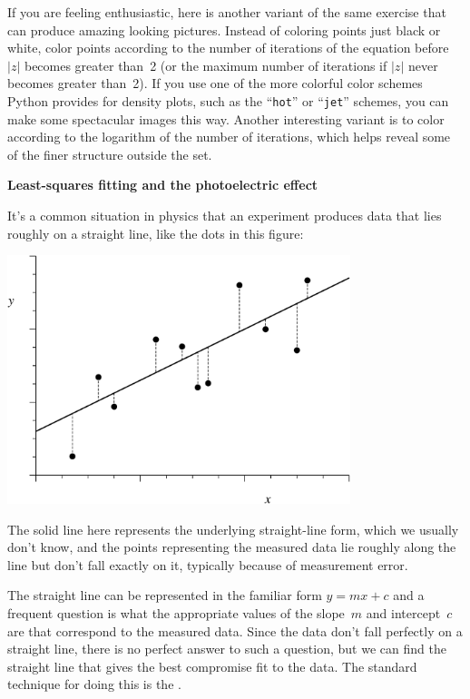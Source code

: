 \documentclass[12pt]{article}
\begin{document}
\begin{exercises}
If you are feeling enthusiastic, here is another variant of the same
exercise that can produce amazing looking pictures.  Instead of coloring
points just black or white, color points according to the number of
iterations of the equation before $|z|$ becomes greater than~2 (or the
maximum number of iterations if $|z|$ never becomes greater than~2).  If
you use one of the more colorful color schemes Python provides for density
plots, such as the ``\verb|hot|'' or ``\verb|jet|'' schemes, you can make
some spectacular images this way.  Another interesting variant is to color
according to the logarithm of the number of iterations, which helps reveal
some of the finer structure outside the set.



\exercise \textbf{Least-squares fitting and the photoelectric effect}

\exskip It's a common situation in physics that an experiment produces data
that lies roughly on a straight line, like the dots in this figure:
\medskip\begin{center}
\includegraphics[width=10cm]{leastsq.eps}
\end{center}
The solid line here represents the underlying straight-line form, which we
usually don't know, and the points representing the measured data lie
roughly along the line but don't fall exactly on it, typically because of
measurement error.

The straight line can be represented in the familiar form $y=mx+c$ and a
frequent question is what the appropriate values of the slope~$m$ and
intercept~$c$ are that correspond to the measured data.  Since the data
don't fall perfectly on a straight line, there is no perfect answer to such
a question, but we can find the straight line that gives the best
compromise fit to the data.  The standard technique for doing this is the
.


\end{exercises}
\end{document}
